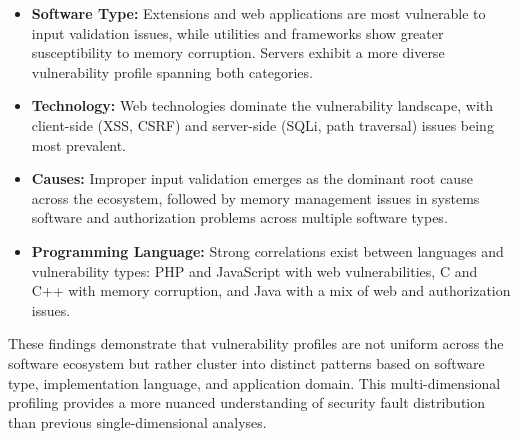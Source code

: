 \begin{itemize}
    \item \textbf{Software Type:} Extensions and web applications are most vulnerable to input validation issues, while utilities and frameworks show greater susceptibility to memory corruption. Servers exhibit a more diverse vulnerability profile spanning both categories.

    \item \textbf{Technology:} Web technologies dominate the vulnerability landscape, with client-side (XSS, CSRF) and server-side (SQLi, path traversal) issues being most prevalent.

    \item \textbf{Causes:} Improper input validation emerges as the dominant root cause across the ecosystem, followed by memory management issues in systems software and authorization problems across multiple software types.

    \item \textbf{Programming Language:} Strong correlations exist between languages and vulnerability types: PHP and JavaScript with web vulnerabilities, C and C++ with memory corruption, and Java with a mix of web and authorization issues.
\end{itemize}

These findings demonstrate that vulnerability profiles are not uniform across the software ecosystem but rather cluster into distinct patterns based on software type, implementation language, and application domain. This multi-dimensional profiling provides a more nuanced understanding of security fault distribution than previous single-dimensional analyses.
